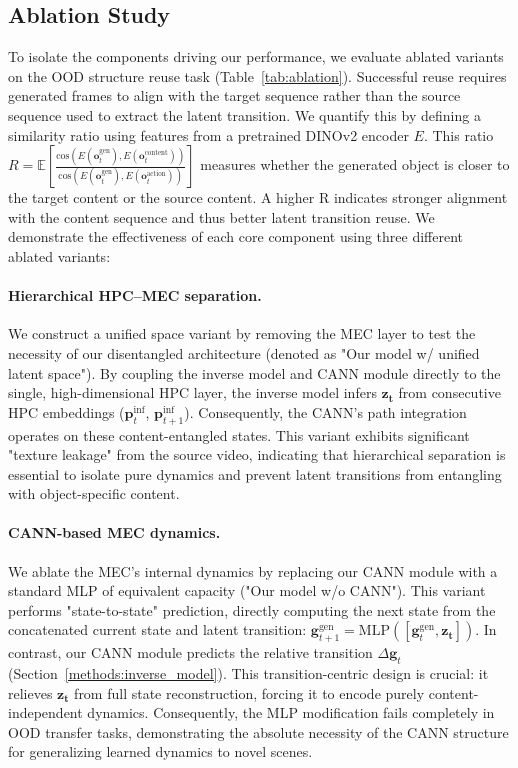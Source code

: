 \vspace{-0.08cm}
\subsection{Ablation Study}
\label{sec:results:ablation}
To isolate the components driving our performance, we evaluate ablated variants on the OOD structure reuse task (Table~\ref{tab:ablation}). Successful reuse requires generated frames to align with the target sequence rather than the source sequence used to extract the latent transition. We quantify this by defining a similarity ratio using features from a pretrained DINOv2 encoder $E$. This ratio $R = \mathbb{E} \left[ \frac{\text{cos}(E(\mathbf{o}_t^{\text{gen}}), E(\mathbf{o}_t^{\text{content}}))}{\text{cos}(E(\mathbf{o}_t^{\text{gen}}), E(\mathbf{o}_t^{\text{action}}))} \right]$ measures whether the generated object is closer to the target content or the source content. A higher R indicates stronger alignment with the content sequence and thus better latent transition reuse. 
We demonstrate the effectiveness of each core component using three different ablated variants:

\vspace{-0.2cm}
\paragraph{Hierarchical HPC–MEC separation.}
We construct a unified space variant by removing the MEC layer to test the necessity of our disentangled architecture (denoted as "Our model w/ unified latent space"). By coupling the inverse model and CANN module directly to the single, high-dimensional HPC layer, the inverse model infers $\boldsymbol{z_t}$ from consecutive HPC embeddings ($\boldsymbol{p}_{t}^{\text{inf}}$, $\boldsymbol{p}_{t+1}^{\text{inf}}$). Consequently, the CANN's path integration operates on these content-entangled states. This variant exhibits significant "texture leakage" from the source video, indicating that hierarchical separation is essential to isolate pure dynamics and prevent latent transitions from entangling with object-specific content.

\vspace{-0.2cm}
\paragraph{CANN-based MEC dynamics.}
We ablate the MEC's internal dynamics by replacing our CANN module with a standard MLP of equivalent capacity ("Our model w/o CANN"). This variant performs "state-to-state" prediction, directly computing the next state from the concatenated current state and latent transition: $\boldsymbol{g}_{t+1}^{\text{gen}} = \text{MLP} ([\boldsymbol{g}_{t}^{\text{gen}}, \boldsymbol{z_t}])$. In contrast, our CANN module predicts the relative transition $\Delta \boldsymbol{g}_{t}$ (Section~\ref{methods:inverse_model}). This transition-centric design is crucial: it relieves $\boldsymbol{z_t}$ from full state reconstruction, forcing it to encode purely content-independent dynamics. Consequently, the MLP modification fails completely in OOD transfer tasks, demonstrating the absolute necessity of the CANN structure for generalizing learned dynamics to novel scenes.

